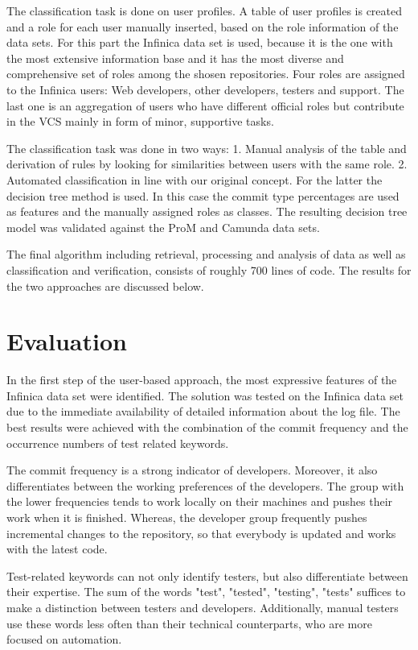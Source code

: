 The classification task is done on user profiles. A table of user profiles is created and a role for each user manually inserted, based on the role information of the data sets. For this part the Infinica data set is used, because it is the one with the most extensive information base and it has the most diverse and comprehensive set of roles among the shosen repositories. Four roles are assigned to the Infinica users: Web developers, other developers, testers and support. The last one is an aggregation of users who have different official roles but contribute in the VCS mainly in form of minor, supportive tasks.

The classification task was done in two ways: 1. Manual analysis of the table and derivation of rules by looking for similarities between users with the same role. 2. Automated classification in line with our original concept. For the latter the decision tree method is used. In this case the commit type percentages are used as features and the manually assigned roles as classes. The resulting decision tree model was validated against the ProM and Camunda data sets.


The final algorithm including retrieval, processing and analysis of data as well as classification and verification, consists of roughly 700 lines of code. The results for the two approaches are discussed below.


\section{Evaluation}

In the first step of the user-based approach, the most expressive features of the Infinica data set were identified. The solution was tested on the Infinica data set due to the immediate availability of detailed information about the log file. The best results were achieved with the combination of the commit frequency and the occurrence numbers of test related keywords.


The commit frequency is a strong indicator of developers. Moreover, it also differentiates between the working preferences of the developers. The group with the lower frequencies tends to work locally on their machines and pushes their work when it is finished. Whereas, the developer group frequently pushes incremental changes to the repository, so that everybody is updated and works with the latest code.


Test-related keywords can not only identify testers, but also differentiate between their expertise. The sum of the words "test", "tested", "testing", "tests" suffices to make a distinction between testers and developers. Additionally, manual testers use these words less often than their technical counterparts, who are more focused on automation.


